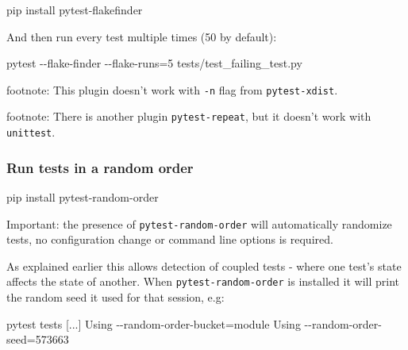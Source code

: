 \documentclass[
]{report}
\newenvironment{Shaded}{\begin{snugshade}}{\end{snugshade}}
\newcommand{\AttributeTok}[1]{\textcolor[rgb]{0.40,0.45,0.13}{#1}}
\newcommand{\ExtensionTok}[1]{\textcolor[rgb]{0.00,0.23,0.31}{#1}}
\newcommand{\NormalTok}[1]{\textcolor[rgb]{0.00,0.23,0.31}{#1}}
\newcommand{\OperatorTok}[1]{\textcolor[rgb]{0.37,0.37,0.37}{#1}}
\begin{document}
\begin{Shaded}
\begin{Highlighting}[]
\ExtensionTok{pip}\NormalTok{ install pytest{-}flakefinder}
\end{Highlighting}
\end{Shaded}

And then run every test multiple times (50 by default):

\begin{Shaded}
\begin{Highlighting}[]
\ExtensionTok{pytest} \AttributeTok{{-}{-}flake{-}finder} \AttributeTok{{-}{-}flake{-}runs}\OperatorTok{=}\NormalTok{5 tests/test\_failing\_test.py}
\end{Highlighting}
\end{Shaded}

footnote: This plugin doesn't work with \texttt{-n} flag from
\texttt{pytest-xdist}.

footnote: There is another plugin \texttt{pytest-repeat}, but it doesn't
work with \texttt{unittest}.

\subsubsection{Run tests in a random
order}\label{run-tests-in-a-random-order}

\begin{Shaded}
\begin{Highlighting}[]
\ExtensionTok{pip}\NormalTok{ install pytest{-}random{-}order}
\end{Highlighting}
\end{Shaded}

Important: the presence of \texttt{pytest-random-order} will
automatically randomize tests, no configuration change or command line
options is required.

As explained earlier this allows detection of coupled tests - where one
test's state affects the state of another. When
\texttt{pytest-random-order} is installed it will print the random seed
it used for that session, e.g:

\begin{Shaded}
\begin{Highlighting}[]
\ExtensionTok{pytest}\NormalTok{ tests}
\ExtensionTok{[...]}
\ExtensionTok{Using} \AttributeTok{{-}{-}random{-}order{-}bucket}\OperatorTok{=}\NormalTok{module}
\ExtensionTok{Using} \AttributeTok{{-}{-}random{-}order{-}seed}\OperatorTok{=}\NormalTok{573663}
\end{Highlighting}
\end{Shaded}
\end{document}
